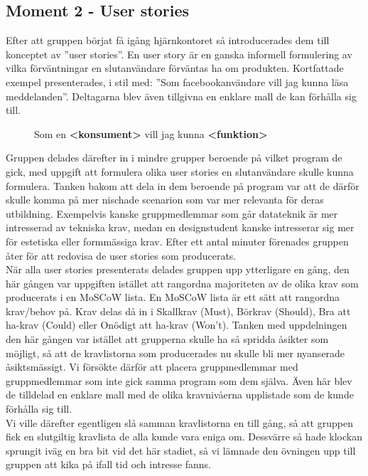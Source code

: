 \documentclass[a4paper, titlepage,12pt]{article}
\begin{document}
		\subsection{Moment 2 - User stories}
			Efter att gruppen börjat få igång hjärnkontoret så introducerades dem till konceptet av ''user stories''. En user story är en ganska informell formulering av vilka förväntningar en slutanvändare förväntas ha om produkten.\cite{userstories} Kortfattade exempel presenterades, i stil med: ''Som facebookanvändare vill jag kunna läsa meddelanden''. Deltagarna blev även tillgivna en enklare mall de kan förhålla sig till.

			\begin{figure}[h!]
				\begin{center}
				Som en \textbf{<konsument>} vill jag kunna \textbf{<funktion>}
				\end{center}
			\end{figure}

			Gruppen delades därefter in i mindre grupper beroende på vilket program de gick, med uppgift att formulera olika user stories en slutanvändare skulle kunna formulera. Tanken bakom att dela in dem beroende på program var att de därför skulle komma på mer nischade scenarion som var mer relevanta för deras utbildning. Exempelvis kanske gruppmedlemmar som går datateknik är mer intresserad av tekniska krav, medan en designstudent kanske intresserar sig mer för estetiska eller formmässiga krav. Efter ett antal minuter förenades gruppen åter för att redovisa de user stories som producerats.\\

			När alla user stories presenterats delades gruppen upp ytterligare en gång, den här gången var uppgiften istället att rangordna majoriteten av de olika krav som producerats i en MoSCoW lista. En MoSCoW lista är ett sätt att rangordna krav/behov på. Krav delas då in i Skallkrav (Must), Börkrav (Should), Bra att ha-krav (Could) eller Onödigt att ha-krav (Won't).\cite{moscow} Tanken med uppdelningen den här gången var istället att grupperna skulle ha så spridda åsikter som möjligt, så att de kravlistorna som producerades nu skulle bli mer nyanserade åsiktsmässigt. Vi försökte därför att placera gruppmedlemmar med gruppmedlemmar som inte gick samma program som dem själva. Även här blev de tilldelad en enklare mall med de olika kravnivåerna upplistade som de kunde förhålla sig till.\\

			Vi ville därefter egentligen slå samman kravlistorna en till gång, så att gruppen fick en slutgiltig kravlista de alla kunde vara eniga om. Dessvärre så hade klockan sprungit iväg en bra bit vid det här stadiet, så vi lämnade den övningen upp till gruppen att kika på ifall tid och intresse fanns.
\end{document}
